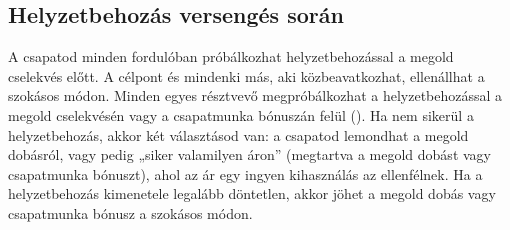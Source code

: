 \subsection{Helyzetbehozás versengés során}

A csapatod minden fordulóban próbálkozhat helyzetbehozással a megold cselekvés előtt. A célpont és mindenki más, aki közbeavatkozhat, ellenállhat a szokásos módon. Minden egyes résztvevő megpróbálkozhat a helyzetbehozással a megold cselekvésén vagy a csapatmunka bónuszán felül (). Ha nem sikerül a helyzetbehozás, akkor két választásod van: a csapatod lemondhat a megold dobásról, vagy pedig „siker valamilyen áron” (megtartva a megold dobást vagy csapatmunka bónuszt), ahol az ár egy ingyen kihasználás az ellenfélnek. Ha a helyzetbehozás kimenetele legalább döntetlen, akkor jöhet a megold dobás vagy csapatmunka bónusz a szokásos módon.
